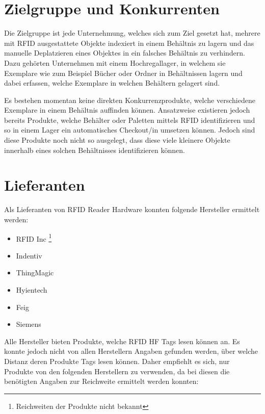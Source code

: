 \section{Zielgruppe und Konkurrenten}
Die Zielgruppe ist jede Unternehmung, welches sich zum Ziel gesetzt hat, mehrere mit RFID ausgestattete Objekte indexiert in einem Behältnis zu lagern und das manuelle Deplatzieren eines Objektes in ein falsches Behältnis zu verhindern.
Dazu gehörten Unternehmen mit einem Hochregallager, in welchem sie Exemplare wie zum Beispiel Bücher oder Ordner in Behältnissen lagern und dabei erfassen, welche Exemplare in welchen Behältern gelagert sind.

Es bestehen momentan keine direkten Konkurrenzprodukte, welche verschiedene Exemplare in einem Behältnis auffinden können. Ansatzweise existieren jedoch bereits Produkte, welche  Behälter oder Paletten mittels RFID identifizieren und so in einem Lager ein automatisches Checkout/in umsetzen können. Jedoch sind diese Produkte noch nicht so ausgelegt, dass diese viele kleinere Objekte innerhalb eines solchen Behältnisses identifizieren können.

\section{Lieferanten}
Als Lieferanten von RFID Reader Hardware konnten folgende Hersteller ermittelt werden:
\renewcommand*{\thefootnote}{\fnsymbol{footnote}}
\begin{itemize}
	\item RFID Inc \footnote[1]{\label{note:range_unknown}Reichweiten der Produkte nicht bekannt}
	\item Indentiv \hyperref[note:range_unknown]{\footnotemark[1]}
	\item ThingMagic \hyperref[note:range_unknown]{\footnotemark[1]}
	\item Hyientech
	\item Feig
	\item Siemens
\end{itemize}
\renewcommand*{\thefootnote}{\arabic{footnote}}

\noindent
Alle Hersteller bieten Produkte, welche RFID HF Tags lesen können an. Es konnte jedoch nicht von allen Herstellern Angaben gefunden werden, über welche Distanz deren Produkte Tags lesen können. Daher empfiehlt es sich, nur Produkte von den folgenden Herstellern zu verwenden, da bei diesen die benötigten Angaben zur Reichweite ermittelt werden konnten:

